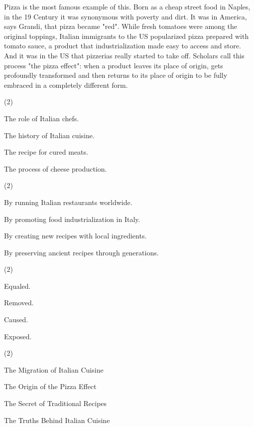 \documentclass{英语试卷}
\begin{document}
\par Pizza is the most famous example of this. Born as a cheap street food in Naples, in the 19 Century it was synonymous with poverty and dirt. It was in America, says Grandi, that pizza became "red". While fresh tomatoes were among the original toppings, Italian immigrants to the US popularized pizza prepared with tomato sauce, a product that industrialization made easy to access and store. And it was in the US that pizzerias really started to take off. Scholars call this process "the pizza effect": when a product leaves its place of origin, gets profoundly transformed and then returns to its place of origin to be fully embraced in a completely different form.\par
{}
\begin{choices}(2)
  \item The role of Italian chefs.
  \item The history of Italian cuisine.
  \item The recipe for cured meats.
  \item The process of cheese production.
\end{choices}
\begin{choices}(2)
  \item By running Italian restaurants worldwide.
  \item By promoting food industrialization in Italy.
  \item By creating new recipes with local ingredients.
  \item By preserving ancient recipes through generations.
\end{choices}
\begin{choices}(2)
  \item Equaled.
  \item Removed.
  \item Caused.
  \item Exposed.
\end{choices}
\begin{choices}(2)
  \item The Migration of Italian Cuisine
  \item The Origin of the Pizza Effect
  \item The Secret of Traditional Recipes
  \item The Truths Behind Italian Cuisine
\end{choices}
\end{document}
